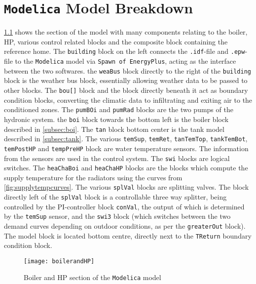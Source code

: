 \chapter{\texttt{Modelica}  Model Breakdown} \label{appx:modelbreakdown}

\cref{fig:boilerandhp} shows the section of the model with many components relating to the boiler, \ac{HP}, various control related blocks and the composite block containing the reference home. The \texttt{building} block on the left connects the \texttt{.idf}-file and \texttt{.epw}-file to the \texttt{Modelica} model via \texttt{Spawn of EnergyPlus}, acting as the interface between the two softwares. the \texttt{weaBus} block directly to the right of the \texttt{building} block is the weather bus block, essentially allowing weather data to be passed to other blocks. The \texttt{bou[]} block and the block directly beneath it act as boundary condition blocks, converting the climatic data to infiltrating and exiting air to the conditioned zones. The \texttt{pumBOi} and \texttt{pumRad} blocks are the two pumps of the hydronic system. the \texttt{boi} block towards the bottom left is the boiler block described in \cref{subsec:boi}. The \texttt{tan} block bottom center is the tank model described in \cref{subsec:tank}. The various \texttt{temSup}, \texttt{temRet}, \texttt{tanTemTop}, \texttt{tankTemBot}, \texttt{temPostHP} and \texttt{tempPreHP} block are water temperature sensors. The information from the sensors are used in the control system. The \texttt{swi} blocks are logical switches. The \texttt{heaChaBoi} and \texttt{heaChaHP} blocks are the blocks which compute the supply temperature for the radiators using the curves from \cref{fig:supplytempcurves}. The various \texttt{splVal} blocks are splitting valves. The block directly left of the \texttt{splVal} block is a controllable three way splitter, being controlled by the PI-controller block \texttt{conVal}, the output of which is determined by the \texttt{temSup} sensor, and the \texttt{swi3} block (which switches between the two demand curves depending on outdoor conditions, as per the \texttt{greaterOut} block). The \HP model block is located bottom centre, directly next to the \texttt{TReturn} boundary condition block.
\begin{figure}[htb]
    \centering
    \texttt{[image: boilerandHP]}
    \caption{Boiler and \acs{HP} section of the \texttt{Modelica} model}
    \label{fig:boilerandhp}
\end{figure}

